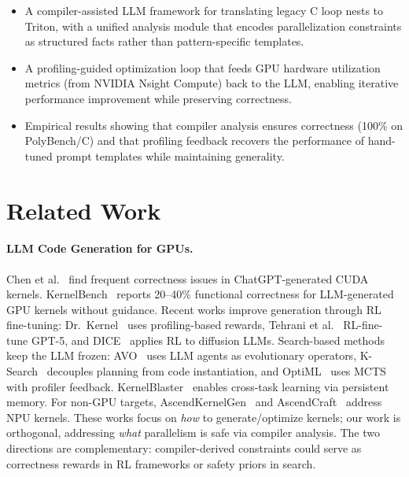 \documentclass[sigconf]{acmart}
\begin{document}
\begin{itemize}
\item A compiler-assisted LLM framework for translating legacy C loop nests to Triton, with a unified analysis module that encodes parallelization constraints as structured facts rather than pattern-specific templates.
\item A profiling-guided optimization loop that feeds GPU hardware utilization metrics (from NVIDIA Nsight Compute) back to the LLM, enabling iterative performance improvement while preserving correctness.
\item Empirical results showing that compiler analysis ensures correctness (100\% on PolyBench/C) and that profiling feedback recovers the performance of hand-tuned prompt templates while maintaining generality.
\end{itemize}







\section{Related Work}
\label{sec:related}

\paragraph{LLM Code Generation for GPUs.}
Chen et al.~\cite{chen2024chatgpt} find frequent correctness issues in ChatGPT-generated CUDA kernels.
KernelBench~\cite{ouyang2024kernelbench} reports 20--40\% functional correctness for LLM-generated GPU kernels without guidance.
Recent works improve generation through RL fine-tuning: Dr.~Kernel~\cite{liu2026drkernel} uses profiling-based rewards, Tehrani et al.~\cite{tehrani2026ftgpt5} RL-fine-tune GPT-5, and DICE~\cite{bai2026dice} applies RL to diffusion LLMs.
Search-based methods keep the LLM frozen: AVO~\cite{chen2026avo} uses LLM agents as evolutionary operators, K-Search~\cite{cao2026ksearch} decouples planning from code instantiation, and OptiML~\cite{bhattacharjee2026optiml} uses MCTS with profiler feedback.
KernelBlaster~\cite{dong2026kernelblaster} enables cross-task learning via persistent memory.
For non-GPU targets, AscendKernelGen~\cite{cao2026ascendkernelgen} and AscendCraft~\cite{wen2026ascendcraft} address NPU kernels.
These works focus on \emph{how} to generate/optimize kernels; our work is orthogonal, addressing \emph{what} parallelism is safe via compiler analysis. The two directions are complementary: compiler-derived constraints could serve as correctness rewards in RL frameworks or safety priors in search.
\end{document}
